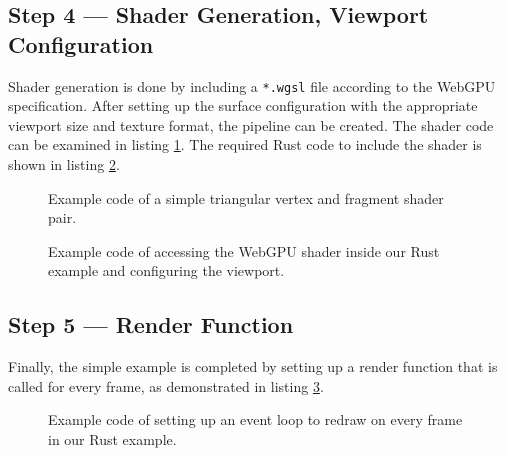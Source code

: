
\subsection{Step 4 --- Shader Generation, Viewport Configuration}
Shader generation is done by including a \lstinline{*.wgsl} file according to the WebGPU specification.
After setting up the surface configuration with the appropriate viewport size and texture format,
the pipeline can be created. The shader code can be examined in listing \ref{code:rust-wgsl}.
The required Rust code to include the shader is shown in listing \ref{code:rust-shader}.


\begin{figure}[tp]
  \centering

  \caption[Code Snippet: WGSL Shader Code]
  {
    Example code of a simple triangular vertex and fragment shader pair.
  }
  \label{code:rust-wgsl}
\end{figure}


\begin{figure}[tp]
  \centering

  \caption[Code Snippet: Shader and Viewport Setup]
  {
    Example code of accessing the WebGPU shader inside our Rust example and configuring the viewport.
  }
  \label{code:rust-shader}
\end{figure}



\subsection{Step 5 --- Render Function}
Finally, the simple example is completed by setting up a render function that is called for every frame,
as demonstrated in listing \ref{code:rust-render}.

\begin{figure}[tp]
  \centering

  \caption[Code Snippet: Event Loop Setup]
  {
    Example code of setting up an event loop to redraw on every frame in our Rust example.
  }
  \label{code:rust-render}
\end{figure}

